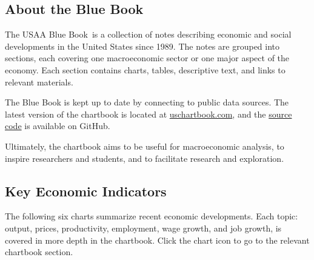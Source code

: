 \documentclass{report}
\begin{document}
\newcommand\BB{{\color{usaablue}Blue Book}}
\begin{minipage}{1.0\textwidth}
\subsection*{About the \BB}
\color{black}
The USAA \BB\  is a collection of notes describing economic and social developments in the United States since 1989. The notes are grouped into sections, each covering one macroeconomic sector or one major aspect of the economy. Each section contains charts, tables, descriptive text, and links to relevant materials. 

The Blue Book is kept up to date by connecting to public data sources. The latest version of the chartbook is located at \href{https://www.bd-econ.com/chartbook.html}{uschartbook.com}, and the \href{https://github.com/bdecon/US-chartbook}{source code} is available on GitHub. 

Ultimately, the chartbook aims to be useful for macroeconomic analysis, to inspire researchers and students, and to facilitate research and exploration.
\end{minipage}
\newpage
\thispagestyle{sectpage}
\subsection*{Key Economic Indicators}

\begin{minipage}{1.0\textwidth}
\small The following six charts summarize recent economic developments. Each topic: output, prices, productivity, employment, wage growth, and job growth, is covered in more depth in the chartbook. Click the chart icon \normalsize {\color{blue}\faChartBar[regular]} \small to go to the relevant chartbook section.
\end{minipage}
\vspace{1mm}
\end{document}
